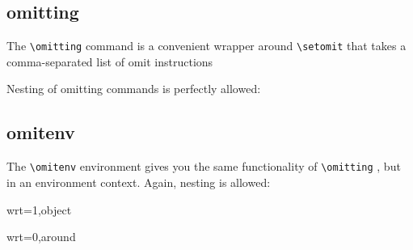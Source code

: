 \documentclass[10pt,a4paper]{article}
\begin{document}
\subsection{omitting}

The \verb+\omitting+ command is a convenient wrapper around \verb+\setomit+ that takes a comma-separated list of omit instructions

\begin{SideBySideExample}[xrightmargin=1cm,frame=single]
  \AngularImpulse[object=1,wrt=0,around=2]
\end{SideBySideExample}

Nesting of omitting commands is perfectly allowed:
\begin{SideBySideExample}[xrightmargin=1cm,frame=single]
  \AngularImpulse[object=1,wrt=0,around=2]
\end{SideBySideExample}

\subsection{omitenv}

The \verb+\omitenv+ environment gives you the same functionality of \verb+\omitting+ , but in an environment context. Again, nesting is allowed:

\begin{SideBySideExample}[xrightmargin=1cm,frame=single]
  \AngularImpulse[object=1,wrt=0,around=2]
  \begin{omitenv}{wrt=1,object}
    \AngularImpulse[object=1,wrt=0,around=2]
    \begin{omitenv}{wrt=0,around}
      \AngularImpulse[object=1,wrt=0,around=2]
    \end{omitenv}
    \AngularImpulse[object=1,wrt=0,around=2]
  \end{omitenv}
\end{SideBySideExample}




\newcommand{\demo}[2]{
  \renewcommand*{\do}[1]{
    {\footnotesize \string#1[##1]} & $#1[##1]$ & \omitting{wrt=0}{$#1[##1]$} \\
  }
  \begin{tabular}{r|l|l|l|l}
  \docsvlist{#2}
  \end{tabular}
}
\end{document}
